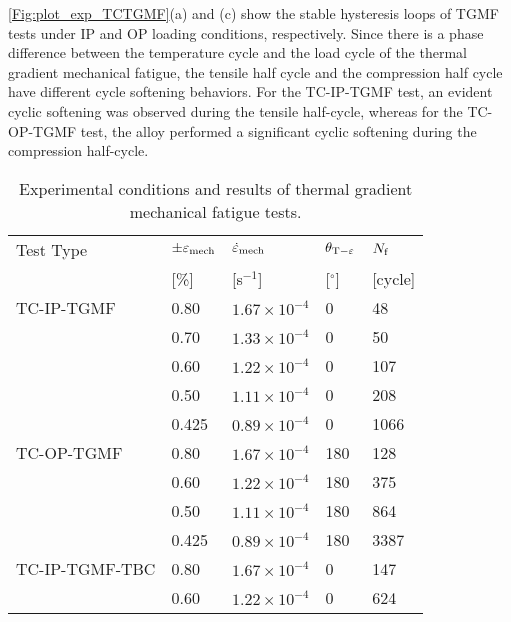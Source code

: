 \ref{Fig:plot_exp_TCTGMF}(a) and (c) show the stable hysteresis loops of TGMF tests under IP and OP loading conditions, respectively.
Since there is a phase difference between the temperature cycle and the load cycle of the thermal gradient mechanical fatigue, the tensile half cycle and the compression half cycle have different cycle softening behaviors.
For the TC-IP-TGMF test, an evident cyclic softening was observed during the tensile half-cycle, whereas for the TC-OP-TGMF test, the alloy performed a significant cyclic softening during the compression half-cycle.

\begin{table}[htbp]
  \centering
  \caption{Experimental conditions and results of thermal gradient mechanical fatigue tests.}
    \begin{tabular}{p{4cm}p{1.5cm}<{\centering}p{3cm}<{\centering}p{1.5cm}<{\centering}p{1.5cm}<{\raggedleft}}
    \toprule
    Test Type & $\pm \varepsilon _{\rm{mech}}$ & $\dot \varepsilon _{\rm{mech}}$ & $\theta_{\rm{T-\varepsilon}}$ & $N_{\rm{f}}$ \\
          & [\%]  & [s$^{-1}$] & [$^\circ$] & [cycle] \\
    \midrule
    TC-IP-TGMF & 0.80  & $1.67\times 10^{-4}$ & 0     & 48 \\
          & 0.70  & $1.33\times 10^{-4}$ & 0     & 50 \\
          & 0.60  & $1.22\times 10^{-4}$ & 0     & 107 \\
          & 0.50  & $1.11\times 10^{-4}$ & 0     & 208 \\
          & 0.425  & $0.89\times 10^{-4}$ & 0     & 1066 \\
    \midrule
    TC-OP-TGMF & 0.80  & $1.67\times 10^{-4}$ & 180   & 128 \\
          & 0.60  & $1.22\times 10^{-4}$ & 180   & 375 \\
          & 0.50  & $1.11\times 10^{-4}$ & 180   & 864 \\
          & 0.425  & $0.89\times 10^{-4}$ & 180   & 3387 \\
    \midrule
    TC-IP-TGMF-TBC & 0.80  & $1.67\times 10^{-4}$ & 0     & 147 \\
          & 0.60  & $1.22\times 10^{-4}$ & 0     & 624 \\
    \bottomrule
    \end{tabular}%
  \label{Tab:test_matrix_TGMF}%
\end{table}%

